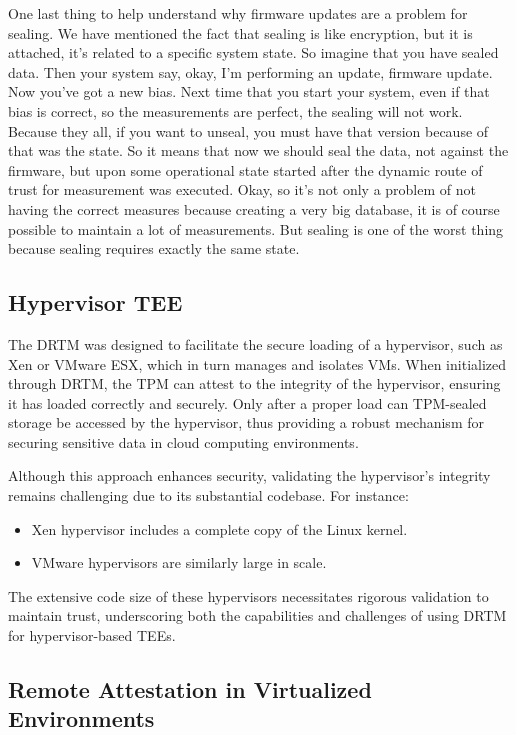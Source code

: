 One last thing to help understand why firmware updates are a problem 
for sealing.
We have mentioned the fact that sealing is like encryption, but it is
attached, it's related to a specific system state. So imagine that you
have sealed data. Then your system say, okay, I'm performing an
update, firmware update. Now you've got a new bias. Next time that you
start your system, even if that bias is correct, so the measurements
are perfect, the sealing will not work. Because they all, if you want
to unseal, you must have that version because of that was the state.
So it means that now we should seal the data, not against the
firmware, but upon some operational state started after the dynamic
route of trust for measurement was executed. Okay, so it's not only a
problem of not having the correct measures because creating a very big
database, it is of course possible to maintain a lot of measurements.
But sealing is one of the worst thing because sealing requires exactly
the same state.


\subsection{Hypervisor TEE}

The DRTM was designed to facilitate the secure loading of a
hypervisor, such as Xen or VMware ESX, which in turn manages and
isolates VMs. When initialized through DRTM, the TPM can attest to the
integrity of the hypervisor, ensuring it has loaded correctly and
securely. Only after a proper load can TPM-sealed storage be accessed
by the hypervisor, thus providing a robust mechanism for securing
sensitive data in cloud computing environments.

Although this approach enhances security, validating the hypervisor's
integrity remains challenging due to its substantial codebase. For
instance:
\begin{itemize}
    \item Xen hypervisor includes a complete copy of the Linux kernel.
    \item VMware hypervisors are similarly large in scale.
\end{itemize}

The extensive code size of these hypervisors necessitates rigorous
validation to maintain trust, underscoring both the capabilities and
challenges of using DRTM for hypervisor-based TEEs.

\subsection{Remote Attestation in Virtualized Environments}

